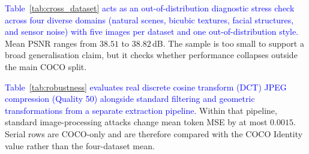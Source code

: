 \documentclass[runningheads]{llncs}
\newcommand{\revised}[1]{\textcolor{blue}{#1}}
\begin{document}
\revised{Table~\ref{tab:cross_dataset} acts as an out-of-distribution diagnostic stress check across four diverse domains (natural scenes, bicubic textures, facial structures, and sensor noise) with five images per dataset and one out-of-distribution style.} Mean PSNR ranges from $38.51$ to $38.82$\,dB. The sample is too small to support a broad generalisation claim, but it checks whether performance collapses outside the main COCO split.

\revised{Table~\ref{tab:robustness} evaluates real discrete cosine transform (DCT) JPEG compression (Quality 50) alongside standard filtering and geometric transformations from a separate extraction pipeline.} Within that pipeline, standard image-processing attacks change mean token MSE by at most $0.0015$. Serial rows are COCO-only and are therefore compared with the COCO Identity value rather than the four-dataset mean.
\end{document}
